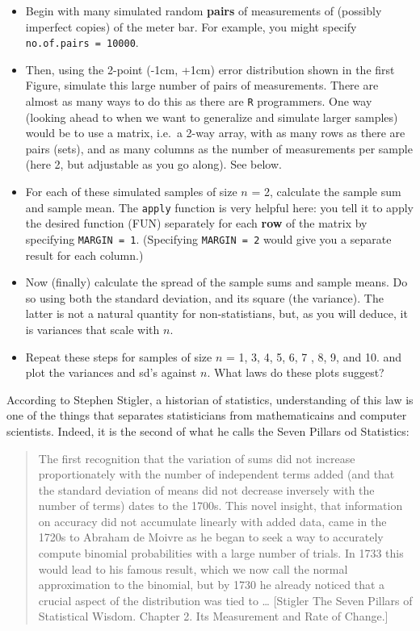 \documentclass[
]{article}
\begin{document}
\begin{enumerate}
  \begin{itemize}
  \item
    Begin with many simulated random \textbf{pairs} of measurements of
    (possibly imperfect copies) of the meter bar. For example, you might
    specify \texttt{no.of.pairs\ =\ 10000}.
  \item
    Then, using the 2-point (-1cm, +1cm) error distribution shown in the
    first Figure, simulate this large number of pairs of measurements.
    There are almost as many ways to do this as there are \texttt{R}
    programmers. One way (looking ahead to when we want to generalize
    and simulate larger samples) would be to use a matrix, i.e.~a 2-way
    array, with as many rows as there are pairs (sets), and as many
    columns as the number of measurements per sample (here 2, but
    adjustable as you go along). See below.
  \item
    For each of these simulated samples of size \(n\) = 2, calculate the
    sample sum and sample mean. The \texttt{apply} function is very
    helpful here: you tell it to apply the desired function (FUN)
    separately for each \textbf{row} of the matrix by specifying
    \texttt{MARGIN\ =\ 1}. (Specifying \texttt{MARGIN\ =\ 2} would give
    you a separate result for each column.)
  \item
    Now (finally) calculate the spread of the sample sums and sample
    means. Do so using both the standard deviation, and its square (the
    variance). The latter is not a natural quantity for non-statistians,
    but, as you will deduce, it is variances that scale with \(n\).
  \item
    Repeat these steps for samples of size \(n\) = 1, 3, 4, 5, 6, 7 , 8,
    9, and 10. and plot the variances and sd's against \(n.\) What laws
    do these plots suggest?
  \end{itemize}
\end{enumerate}

According to Stephen Stigler, a historian of statistics, understanding
of this law is one of the things that separates statisticians from
mathematicains and computer scientists. Indeed, it is the second of what
he calls the Seven Pillars od Statistics:

\begin{quote}
The first recognition that the variation of sums did not increase
proportionately with the number of independent terms added (and that the
standard deviation of means did not decrease inversely with the number
of terms) dates to the 1700s. This novel insight, that information on
accuracy did not accumulate linearly with added data, came in the 1720s
to Abraham de Moivre as he began to seek a way to accurately compute
binomial probabilities with a large number of trials. In 1733 this would
lead to his famous result, which we now call the normal approximation to
the binomial, but by 1730 he already noticed that a crucial aspect of
the distribution was tied to \ldots{} {[}Stigler The Seven Pillars of
Statistical Wisdom. Chapter 2. Its Measurement and Rate of Change.{]}
\end{quote}
\end{document}
